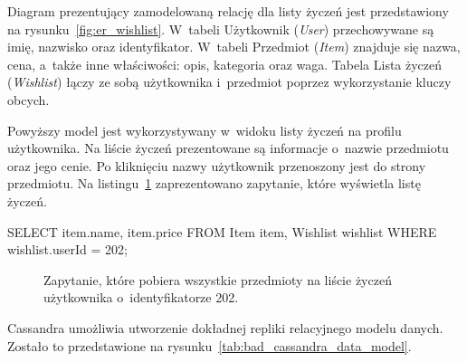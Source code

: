 Diagram prezentujący zamodelowaną relację dla listy życzeń jest przedstawiony na rysunku~\ref{fig:er_wishlist}. W~tabeli Użytkownik (\emph{User}) przechowywane są imię, nazwisko oraz identyfikator. W~tabeli Przedmiot (\emph{Item}) znajduje się nazwa, cena, a~także inne właściwości: opis, kategoria oraz waga. Tabela Lista życzeń (\emph{Wishlist}) łączy ze sobą użytkownika i~przedmiot poprzez wykorzystanie kluczy obcych. 

Powyższy model jest wykorzystywany w~widoku listy życzeń na profilu użytkownika. Na liście życzeń prezentowane są informacje o~nazwie przedmiotu oraz jego cenie. Po kliknięciu nazwy użytkownik przenoszony jest do strony przedmiotu. Na listingu~\ref{lst:sql_wishlist} zaprezentowano zapytanie, które wyświetla listę życzeń.

\begin{verbbox}[\footnotesize]
	SELECT item.name, item.price
	FROM Item item, Wishlist wishlist
	WHERE wishlist.userId = 202;
\end{verbbox}

\begin{figure}[ht!]
	\centering
	\theverbbox

	\caption{Zapytanie, które pobiera wszystkie przedmioty na liście życzeń użytkownika o~identyfikatorze 202.}
	\label{lst:sql_wishlist}
\end{figure}

Cassandra umożliwia utworzenie dokładnej repliki relacyjnego modelu danych. Zostało to przedstawione na rysunku~\ref{tab:bad_cassandra_data_model}.

